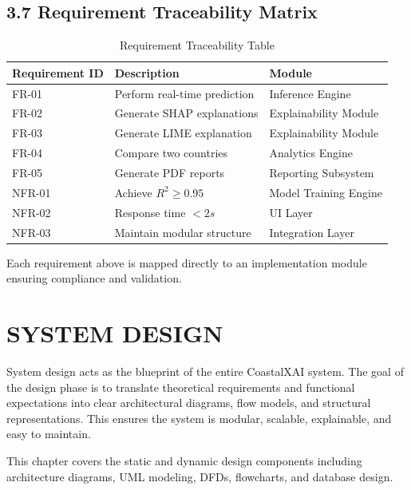 \documentclass[12pt, a4paper]{article}
\begin{document}
\subsection{\textbf{3.7 Requirement Traceability Matrix}}

\begin{table}[H]
\centering
\begin{tabular}{|p{3cm}|p{7cm}|p{3cm}|}
\hline
\textbf{Requirement ID} & \textbf{Description} & \textbf{Module} \\ \hline
FR-01 & Perform real-time prediction & Inference Engine \\ \hline
FR-02 & Generate SHAP explanations & Explainability Module \\ \hline
FR-03 & Generate LIME explanation & Explainability Module \\ \hline
FR-04 & Compare two countries & Analytics Engine \\ \hline
FR-05 & Generate PDF reports & Reporting Subsystem \\ \hline
NFR-01 & Achieve $R^2 \geq 0.95$ & Model Training Engine \\ \hline
NFR-02 & Response time $< 2s$ & UI Layer \\ \hline
NFR-03 & Maintain modular structure & Integration Layer \\ \hline
\end{tabular}
\caption{Requirement Traceability Table}
\end{table}

\noindent
Each requirement above is mapped directly to an implementation module ensuring compliance and validation.

\newpage
\section{\textbf{SYSTEM DESIGN}}

System design acts as the blueprint of the entire CoastalXAI system. The goal of the design phase is to translate theoretical requirements and functional expectations into clear architectural diagrams, flow models, and structural representations. This ensures the system is modular, scalable, explainable, and easy to maintain. 

This chapter covers the static and dynamic design components including architecture diagrams, UML modeling, DFDs, flowcharts, and database design.
\end{document}
